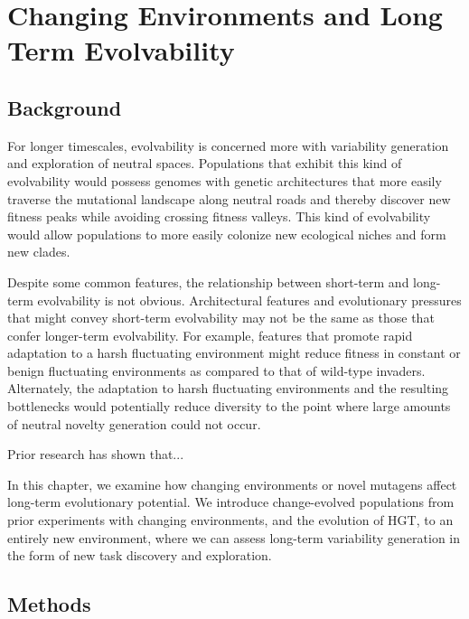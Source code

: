 \documentclass[PhD]{msu-thesis}
\begin{document}
\chapter{Changing Environments and Long Term Evolvability}
\label{chap:ce-longterm}
\section{Background}

For longer timescales, evolvability is concerned more with variability generation and exploration of neutral spaces. Populations that exhibit this kind of evolvability would possess genomes with genetic architectures that more easily traverse the mutational landscape along neutral roads and thereby discover new fitness peaks while avoiding crossing fitness valleys. This kind of evolvability would allow populations to more easily colonize new ecological niches and form new clades\cite{kirschner_evolvability_1998,brookfield_evolution:_2001}.

Despite some common features, the relationship between short-term and long-term evolvability is not obvious. Architectural features and evolutionary pressures that might convey short-term evolvability may not be the same as those that confer longer-term evolvability\cite{pigliucci_is_2008}. For example, features that promote rapid adaptation to a harsh fluctuating environment might reduce fitness in constant or benign fluctuating environments as compared to that of wild-type invaders. Alternately, the adaptation to harsh fluctuating environments and the resulting bottlenecks would potentially reduce diversity to the point where large amounts of neutral novelty generation could not occur.

Prior research has shown that...

In this chapter, we examine how changing environments or novel mutagens affect long-term evolutionary potential. We introduce change-evolved populations from prior experiments with changing environments, and the evolution of HGT, to an entirely new environment, where we can assess long-term variability generation in the form of new task discovery and exploration.

\section{Methods}
\end{document}
